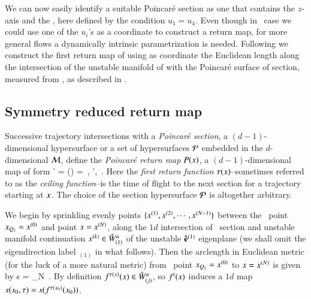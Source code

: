 We can now easily identify a suitable Poincar\'e
section as one that contains the $z$-axis and
the \reqv, here defined by the condition $u_1=u_4$.
Even though in \cLe\ case we could use one of the $u_i$'s as
a coordinate to construct a return map, for more general flows
a dynamically intrinsic parametrization is needed.
Following  we construct the first return map
of  using as coordinate the
Euclidean length along the intersection of the unstable
manifold of  with the Poincar\'e surface of section,
measured from , as described in .


\subsection{\label{s:Poincare}Symmetry reduced return map}

Successive trajectory intersections with a {\em Poincar\'e
section}, a $(d-1)$-dim\-ens\-ion\-al hypersurface
or a set of
hypersurfaces ${\cal P}$ embedded in the $d$-dim\-ens\-ion\-al
{\statesp} ${\cal M}$, define the {\em Poincar\'e return map}
$P({x})$, a $(d-1)$-dim\-ens\-ion\-al map of form
\beq
\ssp' = \PoincM({\ssp})
          =  \flow{\tau(\ssp)}{\ssp}
\,,\qquad
\ssp', \ssp \in \PoincS
\,.
Here the {\em first return function} $\tau(x)$--sometimes
referred to as the {\em ceiling function}--is the time of
flight to the next section for a trajectory starting at $x$.
The choice of the section hypersurface ${\cal P}$ is altogether
arbitrary. 

We begin by sprinkling evenly points
$\{x^{(1)},x^{(2)},\cdots,x^{(N-1)}\}$ between the
\reqv\ point $x_{Q_{1}}=x^{(0)}$ and point  $x=
x^{(N)}$, along the $1d$ intersection of \Poincare\ section and
unstable manifold continuation $x^{(k)} \in \hat{W}^u_{(1)}$ of the unstable ${\bf
\hat{e}}^{(1)}$ eigen\-plane (we shall omit the
eigen\-direction label ${}_{(1)}$ in what follows). Then the
arclength in Euclidean metric (for the luck of a more natural metric)
from \reqv\ point $x_{Q_{1}}=x^{(0)}$ to $x=
x^{(N)}$ is given by
\beq
s = \lim_{N\to\infty}
\,.
By definition $f^{\tau(x)}(x) \in \hat{W}^u_{(j)}$, so
$f^t(x)$ induces a $1d$ map $s(s_0,\tau) =
s(f^{\tau({x_0})}({x_0}))$.

